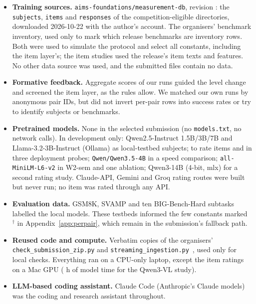 \documentclass{article}
\begin{document}
\begin{itemize}
\item \textbf{Training sources.} \texttt{aims-foundations/measurement-db}, revision \texttt{\FitRevisionShort}: the \texttt{subjects}, \texttt{items} and \texttt{responses} of the \FitNEligible{} competition-eligible directories, downloaded 2026-10-22 with the author's account. The organisers' benchmark inventory, used only to mark which release benchmarks are inventory rows. Both were used to simulate the protocol and select all constants, including the item layer's; the item studies used the release's item texts and features. No other data source was used, and the submitted files contain no data.
\item \textbf{Formative feedback.} Aggregate scores of our runs guided the level change and screened the item layer, as the rules allow. We matched our own runs by anonymous pair IDs, but did not invert per-pair rows into success rates or try to identify subjects or benchmarks.
\item \textbf{Pretrained models.} None in the selected submission (no \texttt{models.txt}, no network calls). In development only: Qwen2.5-Instruct 1.5B/3B/7B and Llama-3.2-3B-Instruct (Ollama) as local-testbed subjects; \texttt{\ItModel} to rate items and in three deployment probes; \texttt{Qwen/Qwen3.5-4B} in a speed comparison; \texttt{all-MiniLM-L6-v2} in W2-sem and one ablation; Qwen3-14B (4-bit, mlx) for a second rating study. Claude-API, Gemini and Groq rating routes were built but never run; no item was rated through any API.
\item \textbf{Evaluation data.} GSM8K, SVAMP and ten BIG-Bench-Hard subtasks labelled the local models. These testbeds informed the few constants marked $^\dagger$ in Appendix~\ref{app:perpair}, which remain in the submission's fallback path.
\item \textbf{Reused code and compute.} Verbatim copies of the organisers' \texttt{check\_submission\_zip.py} and \texttt{streaming\_ingestion.py}~\citep{paiec_baselines_2026}, used only for local checks. Everything ran on a CPU-only laptop, except the item ratings on a Mac GPU (\ItRatingHours{} h of model time for the Qwen3-VL study).
\item \textbf{LLM-based coding assistant.} Claude Code (Anthropic's Claude models) was the coding and research assistant throughout.
\end{itemize}



\appendix
\end{document}
